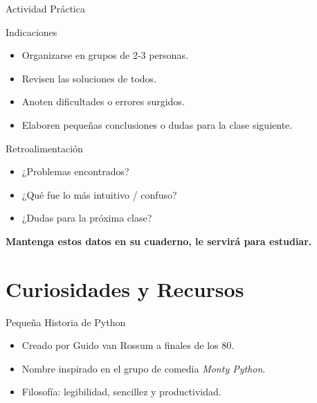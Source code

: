 \documentclass[10pt]{beamer}
\begin{document}
\begin{frame}{Actividad Práctica}
\begin{block}{Indicaciones}
  \begin{itemize}
    \item Organizarse en grupos de 2-3 personas.
    \item Revisen las soluciones de todos.
    \item Anoten dificultades o errores surgidos.
    \item Elaboren pequeñas conclusiones o dudas para la clase siguiente.
  \end{itemize}
\end{block}
\end{frame}

\begin{frame}{Retroalimentación}
  \begin{itemize}
    \item ¿Problemas encontrados?
    \item ¿Qué fue lo más intuitivo / confuso?
    \item ¿Dudas para la próxima clase?
  \end{itemize}
  \vspace{0.3cm}
  \textbf{Mantenga estos datos en su cuaderno, le servirá para estudiar.}
\end{frame}

\section{Curiosidades y Recursos}

\begin{frame}{Pequeña Historia de Python}
  \begin{itemize}
    \item Creado por Guido van Rossum a finales de los 80.
    \item Nombre inspirado en el grupo de comedia \emph{Monty Python}.
    \item Filosofía: legibilidad, sencillez y productividad.
  \end{itemize}
\end{frame}
\end{document}
